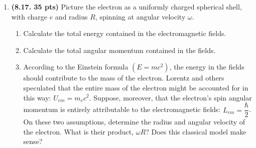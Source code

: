 \documentclass[fleqn]{article}
\begin{document}
\begin{enumerate}
    \item \textbf{(8.17. 35 pts)} Picture the electron as a uniformly charged spherical shell, with
    charge $e$ and radius $R$, spinning at angular velocity $\omega$.
    \begin{enumerate}
      \item Calculate the total energy contained in the electromagnetic fields.


      \item Calculate the total angular momentum contained in the fields.


      \item According to the Einstein formula $(E = mc^2)$, the energy in the fields should
      contribute to the mass of the electron. Lorentz and others speculated that the
      entire mass of the electron might be accounted for in this way: $U_{em} = m_e c^2$.
      Suppose, moreover, that the electron’s spin angular momentum is entirely
      attributable to the electromagnetic fields: $L_{em}=\dfrac{\hbar}{2}$. On these two 
      assumptions, determine the radius and angular velocity of the electron. What is their
      product, $\omega R$? Does this classical model make sense?
      
    \end{enumerate}


  \end{enumerate}
\end{document}
